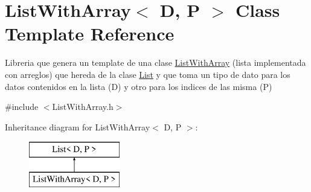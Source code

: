\hypertarget{class_list_with_array}{\section{List\+With\+Array$<$ D, P $>$ Class Template Reference}
\label{class_list_with_array}
}


Libreria que genera un template de una clase \hyperlink{class_list_with_array}{List\+With\+Array} (lista implementada con arreglos) que hereda de la clase \hyperlink{class_list}{List} y que toma un tipo de dato para los datos contenidos en la lista (D) y otro para los indices de las misma (P)  




{\ttfamily \#include $<$List\+With\+Array.\+h$>$}

Inheritance diagram for List\+With\+Array$<$ D, P $>$\+:\begin{figure}[H]
\begin{center}
\leavevmode
\includegraphics[height=2.000000cm]{class_list_with_array}
\end{center}
\end{figure}
